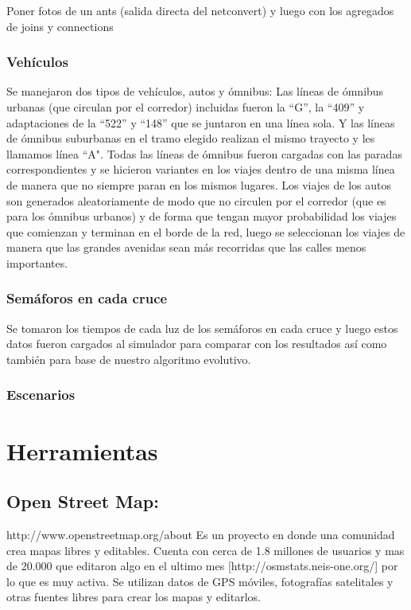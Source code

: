 Poner fotos de un ants (salida directa del netconvert) y luego con los agregados de joins y connections


\subsubsection{Vehículos}
Se manejaron dos tipos de vehículos, autos y ómnibus:
Las  líneas  de  ómnibus  urbanas  (que  circulan  por  el
corredor)  incluidas  fueron  la  “G”,  la  “409”  y
adaptaciones  de  la  “522”  y  “148”  que  se  juntaron  en
una  línea  sola. Y  las líneas de ómnibus suburbanas en
el  tramo  elegido  realizan  el  mismo  trayecto  y  les
llamamos  línea  “A".  Todas  las  líneas  de  ómnibus
fueron cargadas con las paradas correspondientes y se
hicieron  variantes  en  los  viajes  dentro  de  una  misma
línea de manera que no siempre paran en los mismos
lugares.
Los  viajes  de  los  autos  son  generados  aleatoriamente
de modo que no circulen por el corredor (que es para
los  ómnibus  urbanos)  y  de  forma  que  tengan  mayor
probabilidad los viajes que comienzan y terminan en el
borde  de  la  red,  luego  se  seleccionan  los  viajes  de
manera  que  las  grandes  avenidas  sean  más  recorridas
que  las  calles  menos  importantes.

\subsubsection{Semáforos en cada cruce}
Se  tomaron  los  tiempos  de  cada  luz  de  los  semáforos  en
cada  cruce  y  luego  estos  datos  fueron  cargados  al  simulador
para comparar con los  resultados  así como también para base
de nuestro algoritmo evolutivo.

\subsubsection{Escenarios}



\section{Herramientas}

\subsection{Open Street Map:} 
http://www.openstreetmap.org/about  Es un proyecto en donde una comunidad crea mapas libres y editables. Cuenta con cerca de 1.8 millones de usuarios  y  mas de 20.000 que editaron algo en el ultimo mes [http://osmstats.neis-one.org/] por lo que es muy activa. Se utilizan datos de GPS móviles, fotografías satelitales y otras fuentes libres para crear los mapas y editarlos. 

